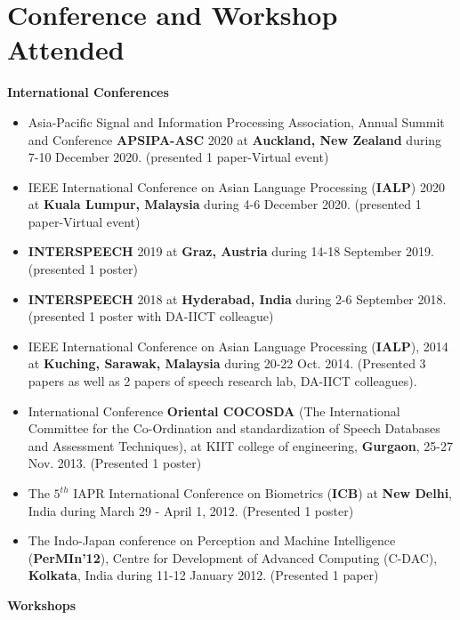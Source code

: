 \documentclass[10pt]{article}
\begin{document}
\section*{Conference and Workshop Attended}
\textbf{International Conferences}
\begin{itemize}
\setlength\itemsep{0.15em}
\item Asia-Pacific Signal and Information Processing Association, Annual Summit and Conference \textbf{APSIPA-ASC} 2020 at \textbf{Auckland, New Zealand} during 7-10 December 2020. (presented 1 paper-Virtual event) 
\item IEEE International Conference on Asian Language Processing  (\textbf{IALP}) 2020 at \textbf{Kuala Lumpur, Malaysia} during 4-6 December 2020. (presented 1 paper-Virtual event)
\item \textbf{INTERSPEECH} 2019 at \textbf{Graz, Austria} during 14-18 September 2019. (presented 1 poster) 
\item \textbf{INTERSPEECH} 2018 at \textbf{Hyderabad, India} during 2-6 September 2018. (presented 1 poster with DA-IICT colleague)
\item IEEE International Conference on Asian Language Processing  (\textbf{IALP}), 2014 at \textbf{Kuching, Sarawak, Malaysia} during 20-22 Oct. 2014. (Presented 3 papers as well as 2 papers of speech research lab, DA-IICT colleagues).
\item International Conference  \textbf{Oriental COCOSDA} (The International Committee for the Co-Ordination and standardization of Speech Databases and Assessment Techniques), at KIIT college of engineering, \textbf{Gurgaon}, 25-27 Nov. 2013.  (Presented 1 poster)
\item The $ 5^{th} $  IAPR International Conference on Biometrics (\textbf{ICB}) at \textbf{New Delhi}, India during March 29 - April 1, 2012. (Presented 1 poster)
\item The Indo-Japan conference on Perception and Machine Intelligence (\textbf{PerMIn'12}), Centre for Development of Advanced Computing (C-DAC), \textbf{Kolkata}, India during 11-12 January 2012. (Presented 1 paper)
\end{itemize}
\textbf{Workshops}
\end{document}
